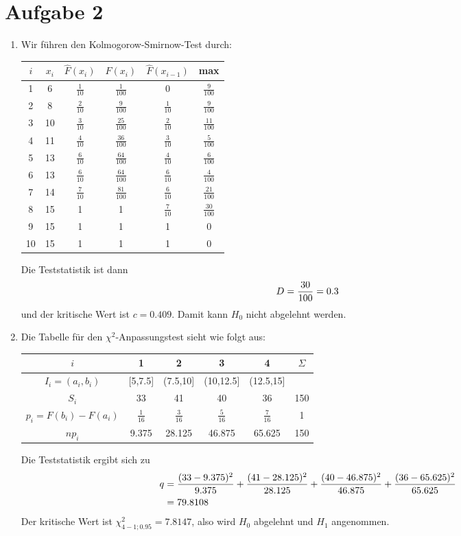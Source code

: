 \documentclass{article}
\begin{document}
	\section*{Aufgabe 2}
	\begin{enumerate}[label=(\alph*)]
		\item Wir führen den Kolmogorow-Smirnow-Test durch:
		\begin{center}
			\begin{tabular}{c|cccc|c}
				$i$ & $x_i$ & $\hat{F}(x_i)$ & $F(x_i)$ & $\hat{F}(x_{i-1})$ & max \\
				\hline
				1 & 6 & $\frac{1}{10}$ & $\frac{1}{100}$ & 0 & $\frac{9}{100}$ \\
				2 & 8 & $\frac{2}{10}$ & $\frac{9}{100}$ & $\frac{1}{10}$ & $\frac{9}{100}$ \\
				3 & 10 & $\frac{3}{10}$ & $\frac{25}{100}$ & $\frac{2}{10}$ & $\frac{11}{100}$ \\
				4 & 11 & $\frac{4}{10}$ & $\frac{36}{100}$ & $\frac{3}{10}$ & $\frac{5}{100}$ \\
				5 & 13 & $\frac{6}{10}$ & $\frac{64}{100}$ & $\frac{4}{10}$ & $\frac{6}{100}$ \\
				6 & 13 & $\frac{6}{10}$ & $\frac{64}{100}$ & $\frac{6}{10}$ & $\frac{4}{100}$ \\
				7 & 14 & $\frac{7}{10}$ & $\frac{81}{100}$ & $\frac{6}{10}$ & $\frac{21}{100}$ \\
				8 & 15 & 1 & 1 & $\frac{7}{10}$ & $\frac{30}{100}$ \\
				9 & 15 & 1 & 1 & 1 & 0 \\
				10 & 15 & 1 & 1 & 1 & 0
			\end{tabular}
		\end{center}
		Die Teststatistik ist dann
		\begin{align}
			D = \frac{30}{100} = 0.3 \notag
		\end{align}
		und der kritische Wert ist $c=0.409$. Damit kann $H_0$ nicht abgelehnt werden.
		\item Die Tabelle für den $\chi^2$-Anpassungstest sieht wie folgt aus:
		\begin{center}
			\begin{tabular}{c|cccc|c}
				$i$ & 1 & 2 & 3 & 4 & $\Sigma$ \\
				\hline
				$I_i=(a_i,b_i)$ & [5,7.5] & (7.5,10] & (10,12.5] & (12.5,15] & \\
				$S_i$ & 33 & 41 & 40 & 36 & 150 \\
				$p_i=F(b_i)-F(a_i)$ & $\frac{1}{16}$ & $\frac{3}{16}$ & $\frac{5}{16}$ & $\frac{7}{16}$ & 1 \\
				$np_i$ & 9.375 & 28.125 & 46.875 & 65.625 & 150 
			\end{tabular}
		\end{center}
		Die Teststatistik ergibt sich zu
		\begin{align}
			q &= \frac{(33-9.375)^2}{9.375} + \frac{(41-28.125)^2}{28.125} + \frac{(40-46.875)^2}{46.875} + \frac{(36-65.625)^2}{65.625} \notag \\
			&= 79.8108 \notag
		\end{align}
		Der kritische Wert ist $\chi^2_{4-1;0.95}=7.8147$, also wird $H_0$ abgelehnt und $H_1$ angenommen.
	\end{enumerate}
	
\end{document}
